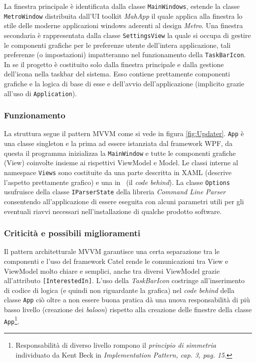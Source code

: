 \documentclass[../RelazioneFinale.tex]{subfiles}
\begin{document}
				La finestra principale è identificata dalla classe \verb|MainWindows|, estende la classe \verb|MetroWindow| distribuita dall'UI toolkit \emph{MahApp} il quale applica alla finestra lo stile delle moderne applicazioni windows aderenti al design \emph{Metro}.
				Una finestra secondaria è rappresentata dalla classe \verb|SettingsView| la quale si occupa di gestire le componenti grafiche per le preferenze utente dell'intera applicazione, tali preferenze (o impostazioni) impatteranno nel funzionamento della \verb|TaskBarIcon|.				
				In se il progetto è costituito solo dalla finestra principale e dalla gestione dell'icona nella taskbar del sistema. Esso contiene prettamente componenti grafiche e la logica di base di esse e dell'avvio dell'applicazione (implicito grazie all'uso di \verb|Application|).
			
			\subsubsection{Funzionamento}
				La struttura segue il pattern MVVM come si vede in figura \ref{fig:Updater}.
				\verb|App| è una classe singleton e la prima ad essere istanziata dal framework WPF, da questa il programma inizializza la \verb|MainWindow| e tutte le componenti grafiche (View) coinvolte insieme ai rispettivi ViewModel e Model.
				Le classi interne al namespace \verb|Views| sono costituite da una parte descritta in XAML (descrive l'aspetto prettamente grafico) e una in \Csharp\ (il \emph{code behind}).
				La classe \verb|Options| usufruisce della classe \verb|IParserState| della libreria \emph{Command Line Parser} consentendo all'applicazione di essere eseguita con alcuni parametri utili per gli eventuali riavvi necessari nell'installazione di qualche prodotto software.
			
			\subsubsection{Criticità e possibili miglioramenti}
				Il pattern architetturale MVVM garantisce una certa separazione tra le componenti e l'uso del framework Catel rende le comunicazioni tra View e ViewModel molto chiare e semplici, anche tra diversi ViewModel grazie all'attributo \verb|[InterestedIn]|.
				L'uso della \emph{TaskBarIcon} costringe all'inserimento di codice di logica (e quindi non riguardante la grafica) nel \emph{code behind} della classe \verb|App| ciò oltre a non essere buona pratica dà una nuova responsabilità di più basso livello (creazione dei \emph{baloon}) rispetto alla creazione delle finestre della classe \verb|App|\footnote{\cite{beck2008implementation} Responsabilità di diverso livello rompono il \emph{principio di simmetria} individuato da Kent Beck in \emph{Implementation Pattern, cap. 3, pag. 15}.}.
				
\end{document}
